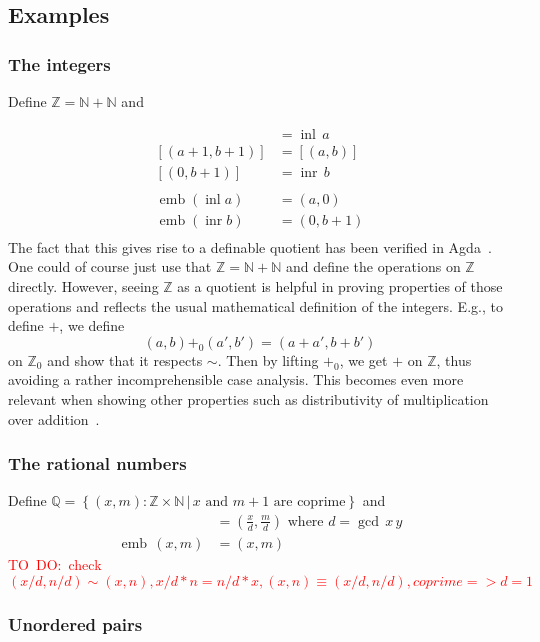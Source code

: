 \documentclass[envcountsame]{llncs}
\newcommand{\todo}[1]{\textcolor{red}{TO~DO:~#1}}
\newcommand{\N}{\mathbb{N}}
\newcommand{\Q}{\mathbb{Q}}
\newcommand{\Z}{\mathbb{Z}}
\providecommand{\class}[1]{[#1]}
\providecommand{\set}  [1]{\left\{#1\right\}}
\DeclareMathOperator{\emb}{emb}
\DeclareMathOperator{\inl}{inl}
\DeclareMathOperator{\inr}{inr}
\begin{document}
\subsection{Examples}\label{sec:dquotients:examples}

\subsubsection*{The integers}
Define $\Z =\N + \N $ and 

\begin{align*}
\class{(a,0)} &= \inl\,a\\
\class{(a+1,b+1)} &= \class{(a,b)}\\
\class{(0,b+1)} &= \inr\,b\\\\
\emb (\inl a) &= (a,0)\\
\emb (\inr b) &= (0,b+1)\\
\end{align*}
The fact that this gives rise to a definable quotient has been verified in Agda~\cite{nuo:report:2010}.
 One could of course just use that $\Z=\N + \N$ and define the operations on $\Z$ directly. However, seeing  $\Z$ as a quotient is helpful in proving properties of those operations and reflects the usual mathematical definition of the integers. E.g., to define $+$, we define 
\[(a,b){+_0}(a', b')= (a+a',b+b')\]
on $\Z_0$ and show that it respects $\sim$. Then by lifting $+_0$, we get $+$ on $\Z$, thus avoiding a rather incomprehensible case analysis. This becomes even more relevant when showing other properties such as distributivity of multiplication over addition~\cite{nuo:report:2010}.

\subsubsection*{The rational numbers}

Define $\Q = \set{(x,m):\Z\times\N \,|\, x \text{ and } m+1 \text{ are coprime}}$ and
\begin{align*}
\class{(x,m)}&=\left(\frac x d, \frac m d\right) \text{ where } d = \gcd\,x \,y\\
\emb \,(x,m) &= (x,m)
\end{align*}
\todo{check $(x/d,n/d)\sim(x,n), x/d*n= n/d*x, (x,n)\equiv(x/d,n/d),coprime=>d=1$}

\subsubsection*{Unordered pairs}
\end{document}
